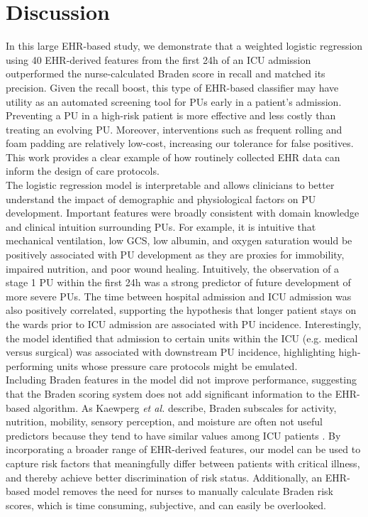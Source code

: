 \documentclass{ws-procs11x85}
\begin{document}
\section{Discussion}
In this large EHR-based study, we demonstrate that a weighted logistic regression using 40 EHR-derived features from the first 24h of an ICU admission outperformed the nurse-calculated Braden score in recall and matched its precision. Given the recall boost, this type of EHR-based classifier may have utility as an automated screening tool for PUs early in a patient's admission. Preventing a PU in a high-risk patient is more effective and less costly than treating an evolving PU. Moreover, interventions such as frequent rolling and foam padding are relatively low-cost, increasing our tolerance for false positives. This work provides a clear example of how routinely collected EHR data can inform the design of care protocols.
\\

\noindent
The logistic regression model is interpretable and allows clinicians to better understand the impact of demographic and physiological factors on PU development. Important features were broadly consistent with domain knowledge and clinical intuition surrounding PUs. For example, it is intuitive that mechanical ventilation, low GCS, low albumin, and oxygen saturation would be positively associated with PU development as they are proxies for immobility, impaired nutrition, and poor wound healing. Intuitively, the observation of a stage 1 PU within the first 24h was a strong predictor of future development of more severe PUs. The time between hospital admission and ICU admission was also positively correlated, supporting the hypothesis that longer patient stays on the wards prior to ICU admission are associated with PU incidence. Interestingly, the model identified that admission to certain units within the ICU (e.g. medical versus surgical) was associated with downstream PU incidence, highlighting high-performing units whose pressure care protocols might be emulated. 
\\

\noindent
Including Braden features in the model did not improve performance, suggesting that the Braden scoring system does not add significant information to the EHR-based algorithm. As Kaewperg \emph{et al.} describe, Braden subscales for activity, nutrition, mobility, sensory perception, and moisture are often not useful predictors because they tend to have similar values among ICU patients \cite{ohio}. By incorporating a broader range of EHR-derived features, our model can be used to capture risk factors that meaningfully differ between patients with critical illness, and thereby achieve better discrimination of risk status. Additionally, an EHR-based model removes the need for nurses to manually calculate Braden risk scores, which is time consuming, subjective, and can easily be overlooked. \\
\end{document}
